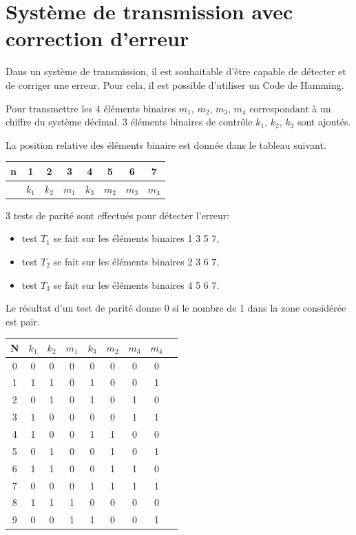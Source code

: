 \section{Système de transmission avec correction d'erreur}

Dans un système de transmission, il est souhaitable d'être capable de détecter et de corriger une erreur. Pour cela, il est possible d'utiliser un \og Code de Hamming\fg.

Pour transmettre les 4 éléments binaires $m_1$, $m_2$, $m_3$, $m_4$ correspondant à un chiffre du système décimal. 3 éléments binaires de contrôle $k_1$, $k_2$, $k_3$ sont ajoutés.

La position relative des éléments binaire est donnée dans le tableau suivant.

\begin{center}
\begin{tabular}{|c|c|c|c|c|c|c|c|}
\hline
n & 1 & 2 & 3 & 4 & 5 & 6 & 7 \\
\hline
  & $k_1$ & $k_2$ & $m_1$ & $k_3$ & $m_2$ & $m_3$ & $m_4$ \\
\hline
\end{tabular} 
\end{center}

3 tests de parité sont effectués pour détecter l'erreur:
\begin{itemize}
 \item test $T_1$ se fait sur les éléments binaires 1 3 5 7,
 \item test $T_2$ se fait sur les éléments binaires 2 3 6 7,
 \item test $T_3$ se fait sur les éléments binaires 4 5 6 7.
\end{itemize}

Le résultat d'un test de parité donne 0 si le nombre de 1 dans la zone considérée est pair.

\begin{center}
\begin{tabular}{|c|c|c|c|c|c|c|c|c|}
\hline
N  & $k_1$ & $k_2$ & $m_1$ & $k_3$ & $m_2$ & $m_3$ & $m_4$ \\
\hline
0 & 0 & 0 & 0 & 0 & 0 & 0 & 0 \\
\hline
1 & 1 & 1 & 0 & 1 & 0 & 0 & 1 \\
\hline
2 & 0 & 1 & 0 & 1 & 0 & 1 & 0 \\
\hline
3 & 1 & 0 & 0 & 0 & 0 & 1 & 1 \\
\hline
4 & 1 & 0 & 0 & 1 & 1 & 0 & 0 \\
\hline
5 & 0 & 1 & 0 & 0 & 1 & 0 & 1 \\
\hline
6 & 1 & 1 & 0 & 0 & 1 & 1 & 0 \\
\hline
7 & 0 & 0 & 0 & 1 & 1 & 1 & 1 \\
\hline
8 & 1 & 1 & 1 & 0 & 0 & 0 & 0 \\
\hline
9 & 0 & 0 & 1 & 1 & 0 & 0 & 1 \\
\hline
\end{tabular} 
\end{center}

